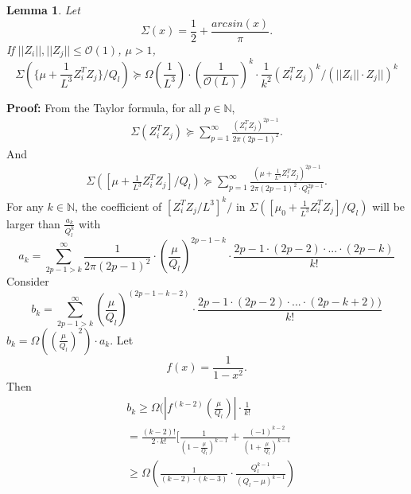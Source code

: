 \documentclass{article}
\newcommand{\cO}{\mathcal{O}}
\newtheorem{lem}[theo]{\textbf{Lemma}}
\begin{document}
\begin{lem}\label{1ch}
Let
\begin{equation}
\Sigma(x)=\frac{1}{2}+\frac{arcsin(x)}{\pi}.
\end{equation}
If $||Z_i||,||Z_j||\leq \cO(1)$, $\mu>1$,
\begin{equation}
\Sigma(\{\mu+\frac{1}{L^3}Z_{i}^TZ_{j}\}/Q_{l})\succeq  \Omega( \frac{1}{L^3}) \cdot (\frac{1}{\cO(L)})^{k}\cdot \frac{1}{k^2} (Z_{i}^TZ_{j})^{k}/(||Z_{i}||\cdot Z_{j}||)^{k}
\end{equation}
\end{lem}
{\bf Proof:}
From the Taylor formula, for all $p\in\mathbb{N}$,
\begin{equation}
\begin{aligned}
\Sigma(Z_{i}^TZ_{j})\succeq \sum_{p=1}^\infty \frac{(Z_{i}^TZ_{j})^{2p-1}}{2\pi (2p-1)^2}.
\end{aligned}
\end{equation}
And
\begin{equation}
\begin{aligned}
\Sigma([\mu+\frac{1}{L^3}Z_{i}^TZ_{j}]/Q_l)\succeq \sum_{p=1}^\infty \frac{(\mu+\frac{1}{L^3}Z_{i}^TZ_{j} )^{2p-1}}{2\pi (2p-1)^2\cdot Q_l^{2p-1}}.
\end{aligned}
\end{equation}
For any $k\in \mathbb{N}$, the coefficient of $[Z_{i}^TZ_{j}/L^3]^{k}/$ in $\Sigma([\mu_0+\frac{1}{L^3}Z_{i}^TZ_{j} ]/Q_l)$ will be larger than $\frac{a_{k}}{Q_l^{k}}$ with
\begin{equation}
a_{k}=\sum_{2p-1>k}^\infty \frac{1}{2\pi (2p-1)^2}\cdot (\frac{\mu}{Q_l})^{2p-1-k}\cdot \frac{2p-1\cdot (2p-2) \cdot ... \cdot (2p-k)}{k!}
\end{equation}
Consider
\begin{equation}
b_{k}=\sum_{2p-1>k}^\infty  (\frac{\mu}{Q_l})^{(2p-1-k-2)}\cdot \frac{2p-1\cdot (2p-2) \cdot ... \cdot (2p-k+2))}{k!}
\end{equation}
$b_{k}=\Omega((\frac{\mu}{Q_l})^{2})\cdot a_k$.
Let
\begin{equation}
f(x)=\frac{1}{1-x^2}.
\end{equation}
Then
\begin{equation}
\begin{aligned}
&b_{k}\geq \Omega(|f^{(k-2)}(\frac{\mu}{Q_l})|\cdot \frac{1}{k!}\\
&=\frac{(k-2)!}{2\cdot k!}[\frac{1}{(1-\frac{\mu}{Q_l})^{k-1}}+\frac{(-1)^{k-2}}{(1+\frac{\mu}{Q_l})^{k-1}}\\
&\geq \Omega(\frac{1}{ (k-2)\cdot (k-3)}\cdot \frac{Q_l^{k-1}}{(Q_l-\mu)^{k-1}})
\end{aligned}
\end{equation}
\end{document}
